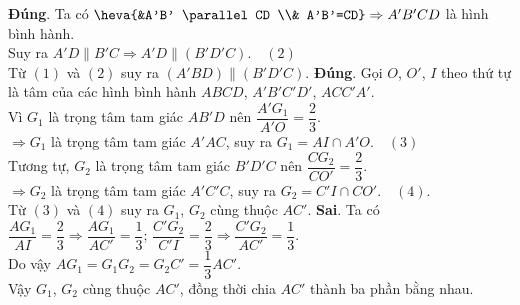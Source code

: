 \begin{ex}
{\begin{itemchoice}
   \itemch \textbf{Đúng}. Ta  có $\heva{&A'B' \parallel CD \\& A'B'=CD} \Rightarrow A'B'CD$ là hình bình hành.\\
   Suy ra $A'D \parallel B'C  \Rightarrow A'D \parallel (B'D'C).\quad(2)$\\
   Từ $(1)$ và $(2)$  suy ra $(A'BD) \parallel(B'D'C)$.
   \itemch \textbf{Đúng}. Gọi $O$,  $O'$, $I$ theo thứ tự là tâm của các hình bình hành $ABCD$, $A'B'C'D'$, $ACC'A'$.\\
   Vì $G_1$ là trọng tâm tam giác $AB'D$  nên $\dfrac{A'G_1}{A'O}=\dfrac{2}{3}$.\\ $\Rightarrow G_1$ là trọng tâm tam giác $A'AC$, suy ra $G_1=AI \cap A'O. \quad(3)$\\
   Tương tự, $G_2$ là trọng tâm tam giác $B'D'C$ nên $\dfrac{CG_2}{CO'}=\dfrac{2}{3}$.\\ $\Rightarrow G_2$ là trọng tâm tam  giác $A'C'C$, suy ra $G_2=C'I \cap CO'.\quad(4)$. \\
   Từ $(3)$ và  $(4)$ suy ra $G_1$, $G_2$ cùng thuộc $AC'$.
   \itemch \textbf{Sai}. 
   Ta có $\dfrac{A G_1}{A I}=\dfrac{2}{3} \Rightarrow \dfrac{A G_1}{A C'}=\dfrac{1}{3}$; $\dfrac{C'G_2}{C'I}=\dfrac{2}{3}  \Rightarrow \dfrac{C'G_2}{A C'}=\dfrac{1}{3}$.\\
   Do  vậy $AG_1=G_1G_2=G_2C'=\dfrac{1}{3} AC'$.\\
   Vậy $G_1$, $G_2$ cùng thuộc $AC'$,  đồng thời chia $AC'$ thành ba phần bằng nhau.
 \end{itemchoice} }
\end{ex}


